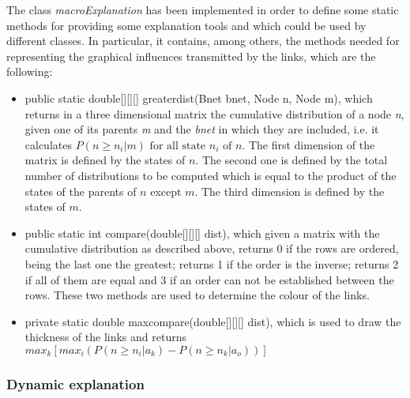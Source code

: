 The class \emph{macroExplanation} has been implemented in order to
define some static methods for providing some explanation tools
and which could be used by different classes. In particular, it
contains, among others, the methods needed for representing the
graphical influences transmitted by the links, which are the
following:
\begin{itemize}
  \item public static double[][][] greaterdist(Bnet bnet, Node n, Node
  m), which returns in a three dimensional matrix the cumulative
  distribution of a node \emph{n}, given one of its parents \emph{m} and the \emph{bnet}
  in which they are included, i.e. it calculates $P(n\geq n_{i}|m) \mbox{ for all state }n_{i}\mbox{ of
  }n$. The first dimension of the matrix is defined by the states of
  $n$. The second one is defined by the total number of
  distributions to be computed which is equal to the product of
  the states of the parents of $n$ except $m$. The third dimension is defined
  by the states of $m$.
   \item public static int compare(double[][][] dist), which given
   a matrix with the cumulative distribution as described above,
   returns 0 if the rows are ordered, being the last one the
   greatest; returns 1 if the order is the inverse; returns 2 if
   all of them are equal and 3 if an order can not be established between the
   rows. These two methods are used to determine the colour of the
   links.
  \item private static double maxcompare(double[][][] dist), which
  is used to draw the thickness of the links and
  returns $max_{k}[max_{i}(P(n \geq n_{i}|a_{k})-P(n \geq
  n_{k}|a_{o}))]$
\end{itemize}

\subsubsection{Dynamic explanation}

